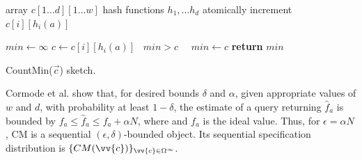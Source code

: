 \begin{algorithm}
    \begin{algorithmic}[1]

        \State array $c[1 \dots d][1 \dots w]$ 
        \State hash functions $h_1, \dots h_d$ 
        \Statex
        \State atomically increment $c[i][h_i(a)]$ \label{ivl-l:counter-inc}
        \EndFor
        \EndProcedure


        \State $min \gets \infty$
        \State $c \gets c[i][h_i(a)]$ \label{ivl-l:read-min}
        \State \algorithmicif\ $min > c$ \ \algorithmicthen\ $min \gets c$ \label{ivl-l:min-update}
        \EndFor
        \State \textbf{return} $min$
        \EndProcedure
    \end{algorithmic}
    \caption{CountMin($\vec{c}$) sketch.}
    \label{ivl-alg:count-min}
\end{algorithm}

Cormode et al. show that, for desired bounds $\delta$ and $\alpha$, given appropriate values of $w$ and $d$, with probability
at least $1-\delta$, the estimate of a query returning $\hat{f}_a$ is bounded by $f_a \leq \hat{f}_a \leq f_a + \alpha N$,
where  and $f_a$ is the ideal value.
Thus, for $\epsilon= \alpha N$, CM is a sequential $(\epsilon, \delta)$-bounded
object. Its sequential specification distribution is $\{CM(\vv{c})\}_{\vv{c} \in \Omega^\infty}$.

